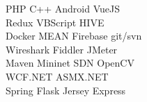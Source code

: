 \documentclass[]{deedy-resume-openfont}
\begin{document}
\begin{minipage}[t]{0.33\textwidth}
PHP \textbullet{} C++ \textbullet{} Android \textbullet{} VueJS \\
Redux \textbullet{} VBScript \textbullet{} HIVE \\
Docker \textbullet{} MEAN \textbullet{} Firebase \textbullet{} git/svn \\
Wireshark \textbullet{} Fiddler \textbullet{} JMeter \\
Maven \textbullet{} Mininet SDN \textbullet{} OpenCV \\
WCF.NET \textbullet{} ASMX.NET \\
Spring \textbullet{} Flask \textbullet{} Jersey \textbullet{} Express

\sectionsep

%
%

\end{minipage} 
\hfill
\end{document}
